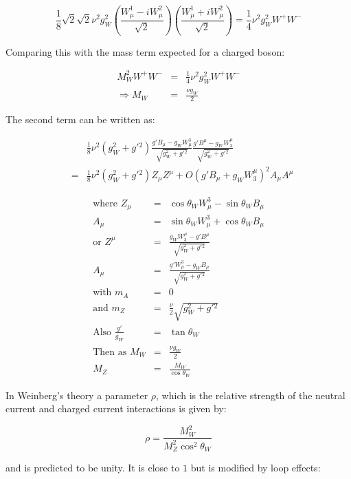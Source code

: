 \[
  \frac{1}{8}\sqrt{2}\sqrt{2} \nu^2 g_W^2 \left(\frac{W_{\mu}^1 - iW_{\mu}^2}{\sqrt{2}}\right)\left(\frac{W_{\mu}^1 + iW_{\mu}^2}{\sqrt{2}}\right) = \frac{1}{4}\nu^2g_W^2 W^+W^-
\]

Comparing this with the mass term expected for a charged boson:

\begin{eqnarray*}
  M_W^2 W^+W^- & = & \frac{1}{4}\nu^2 g_W^2 W^+W^- \\
  \Rightarrow M_W & = & \frac{\nu g_W}{2}
\end{eqnarray*}

The second term can be written as:

\begin{eqnarray*}
  & &
  \frac{1}{8}\nu^2\left(g_W^2 + g'{}^2\right)
  \frac{g'B_{\mu} - g_WW_{\mu}^3}{\sqrt{g_W^2 + g'{}^2}}
  \frac{g'B^{\mu} - g_WW^{\mu}_3}{\sqrt{g_W^2 + g'{}^2}} \\
  & = &
  \frac{1}{8}\nu^2\left(g_W^2 + g'{}^2 \right)Z_{\mu}Z^{\mu} + O\left(g'B_{\mu} + g_W W^{\mu}_3\right)^2A_{\mu}A^{\mu}
\end{eqnarray*}

\begin{eqnarray*}
  \textrm{where } Z_{\mu} & = & \cos\theta_W W_{\mu}^3 - \sin\theta_W B_{\mu} \\
  A_{\mu} & = & \sin\theta_W W_{\mu}^3 + \cos\theta_W B_{\mu} \\
  \textrm{or } Z^{\mu} & = & \frac{g_W W^{\mu}_3 - g'B^{\mu}}{\sqrt{g_W^2 + g'{}^2}} \\
  A_{\mu} & = & \frac{g' W_{\mu}^3 - g_W B_{\mu}}{\sqrt{g_W^2 + g'{}^2}} \\
  \textrm{with } m_A & = & 0 \\
  \textrm{and }  m_Z & = & \frac{\nu}{2}\sqrt{g_W^2 + g'{}^2} \\
  \textrm{Also } \frac{g'}{g_W} & = & \tan\theta_W \\
  \textrm{Then as } M_W & = & \frac{\nu g_W}{2} \\
  M_Z & = & \frac{M_W}{\cos\theta_W}
\end{eqnarray*}

In Weinberg's theory a parameter $\rho$, which is the relative strength of the neutral current and charged current interactions is given by:

\[
  \rho = \frac{M_W^2}{M_Z^2 \cos^2\theta_W}
\]

and is predicted to be unity.  It is close to $1$ but is modified by loop effects:

